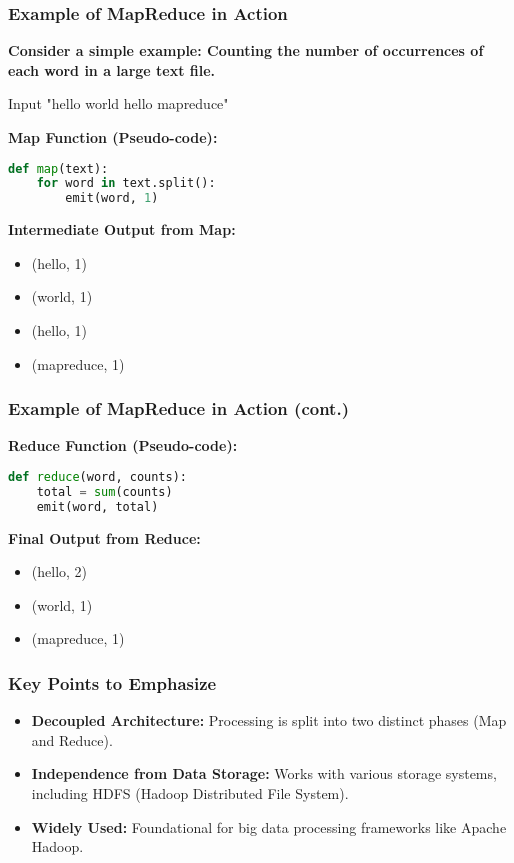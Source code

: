 \documentclass[aspectratio=169]{beamer}
\begin{document}
\begin{frame}[fragile]
    \frametitle{Example of MapReduce in Action}

    \textbf{Consider a simple example: Counting the number of occurrences of each word in a large text file.}

    \begin{block}{Input}
        "hello world hello mapreduce"
    \end{block}

    \textbf{Map Function (Pseudo-code):}
    \begin{lstlisting}[language=Python]
def map(text):
    for word in text.split():
        emit(word, 1)
    \end{lstlisting}

    \textbf{Intermediate Output from Map:}
    \begin{itemize}
        \item (hello, 1)
        \item (world, 1)
        \item (hello, 1)
        \item (mapreduce, 1)
    \end{itemize}
\end{frame}

\begin{frame}[fragile]
    \frametitle{Example of MapReduce in Action (cont.)}

    \textbf{Reduce Function (Pseudo-code):}
    \begin{lstlisting}[language=Python]
def reduce(word, counts):
    total = sum(counts)
    emit(word, total)
    \end{lstlisting}

    \textbf{Final Output from Reduce:}
    \begin{itemize}
        \item (hello, 2)
        \item (world, 1)
        \item (mapreduce, 1)
    \end{itemize}
\end{frame}

\begin{frame}[fragile]
    \frametitle{Key Points to Emphasize}

    \begin{itemize}
        \item \textbf{Decoupled Architecture:} Processing is split into two distinct phases (Map and Reduce).
        \item \textbf{Independence from Data Storage:} Works with various storage systems, including HDFS (Hadoop Distributed File System).
        \item \textbf{Widely Used:} Foundational for big data processing frameworks like Apache Hadoop.
    \end{itemize}
\end{frame}
\end{document}
